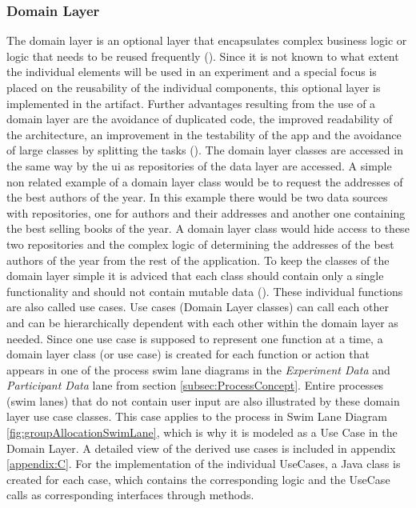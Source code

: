 \subsubsection{Domain Layer}

The domain layer is an optional layer that encapsulates complex business logic or logic that needs to be reused frequently (\cite{Google.2023}). Since it is not known to what extent the individual elements will be used in an experiment and a special focus is placed on the reusability of the individual components, this optional layer is implemented in the artifact. Further advantages resulting from the use of a domain layer are the avoidance of duplicated code, the improved readability of the architecture, an improvement in the testability of the app and the avoidance of large classes by splitting the tasks (\cite{Google.2023}). The domain layer classes are accessed in the same way by the \ac{ui} as repositories of the data layer are accessed. A simple non related example of a domain layer class would be to request the addresses of the best authors of the year. In this example there would be two data sources with repositories, one for authors and their addresses and another one containing the best selling books of the year. A domain layer class would hide access to these two repositories and the complex logic of determining the addresses of the best authors of the year from the rest of the application. To keep the classes of the domain layer simple it is adviced that each class should contain only a single functionality and should not contain mutable data (\cite{Google.2023}). These individual functions are also called use cases. Use cases (Domain Layer classes) can call each other and can be hierarchically dependent with each other within the domain layer as needed. Since one use case is supposed to represent one function at a time, a domain layer class (or use case) is created for each function or action that appears in one of the process swim lane diagrams in the \textit{Experiment Data} and \textit{Participant Data} lane from section \ref{subsec:ProcessConcept}. Entire processes (swim lanes) that do not contain user input are also illustrated by these domain layer use case classes. This case applies to the process in Swim Lane Diagram \ref{fig:groupAllocationSwimLane}, which is why it is modeled as a Use Case in the Domain Layer.
A detailed view of the derived use cases is included in appendix \ref{appendix:C}. For the implementation of the individual UseCases, a Java class is created for each case, which contains the corresponding logic and the UseCase calls as corresponding interfaces through methods.

